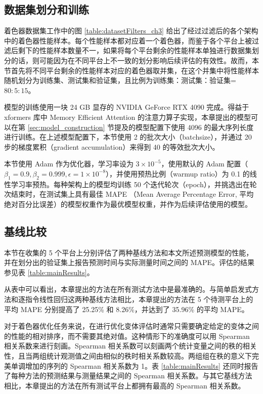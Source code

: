 \subsection{数据集划分和训练}
\label{sec:split_and_training}

{\amend 着色器数据集工作中的}图 \ref{table:datasetFilters_ch3} 给出了经过过滤后的各个架构中的着色器性能样本。每个性能样本都对应着一个着色器，而鉴于各个平台上被过滤后剩下的性能样本数量不一，如果将每个平台剩余的性能样本单独进行数据集划分的话，则可能因为在不同平台上不一致的划分影响后续评估的有效性。故而，{\amend 本节}首先将不同平台剩余的性能样本对应的着色器取并集，在这个并集中将性能样本随机划分为训练集、测试集和验证集，且比例为训练集：测试集：验证集=$80:5:15$。

模型的训练使用一块 24 GB 显存的 NVIDIA GeForce RTX 4090 完成。得益于 xformers \cite{xFormers2022}库中 Memory Efficient Attention 的注意力算子实现\cite{rabe2022selfattention}，{\amend 本章提出的}模型可以在第 \ref{sec:model_construction} 节提及的模型配置下使用 4096 的最大序列长度进行训练。在上述模型配置下，{\amend 本节}使用 2 的批次大小（batchsize），并通过 20 步的梯度累积（gradient accumulation）来得到 40 的等效批次大小。

{\amend 本节}使用 Adam \cite{Kingma2014AdamAM} 作为优化器，学习率设为 $3 \times 10^{-5}$，使用默认的 Adam 配置（$\beta_1=0.9, \beta_2=0.999, \epsilon=1 \times 10^{-8}$），并使用预热比例（warmup ratio）为 0.1 的线性学习率预热。每种架构上的模型均训练 50 个迭代轮次（epoch），并挑选出在轮次结束时，在测试集上具有最佳 MAPE （Mean Average Percentage Error, 平均绝对百分比误差）的模型权重作为最优模型权重，并作为后续评估使用的模型。

\subsection{基线比较}

{\amend 本节}在收集的 5 个平台上分别评估了两种基线方法和本文所述预测模型的性能，并在划分出的验证集上报告预测时间与实际测量时间之间的 MAPE。评估的结果参见表 \ref{table:mainResults}。

从表中可以看出，本章提出的方法在所有测试方法中是最准确的。与简单启发式方法和逐指令线性回归这两种基线方法相比，{\amend 本章}提出的方法在 5 个待测平台上的平均 MAPE 分别提高了 25.25\% 和 8.26\%，并达到了 35.96\% 的平均 MAPE。

对于着色器优化任务来说，在进行优化变体评估时通常只需要确定给定的变体之间的性能的相对排序，而不需要其绝对值。这种情形下的准确度可以用 Spearman 相关系数来进行刻画。Spearman 相关系数可以刻画两个统计变量之间的秩的相关性，且当两组统计观测值之间由相似的秩时相关系数较高。两组组在秩的意义下完美单调增加的序列的 Spearman 相关系数为 1。表 \ref{table:mainResults} 还同时报告了每种方法的预测结果与测量结果之间的 Spearman 相关系数。与其它基线方法相比，{\amend 本章提出的}方法在所有测试平台上都拥有最高的 Spearman 相关系数。

